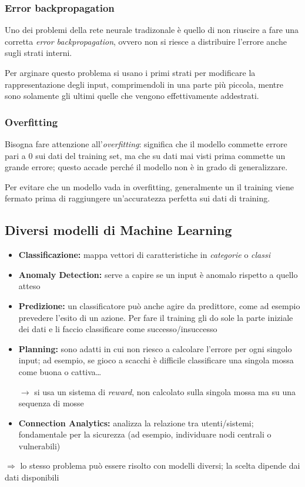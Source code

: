 \documentclass{report}
\begin{document}
\subsubsection{Error backpropagation}
Uno dei problemi della rete neurale tradizonale è quello di non riuscire a fare una corretta \textit{error backpropagation}, ovvero non 
si riesce a distribuire l'errore anche sugli strati interni.

\noindent Per arginare questo problema si usano i primi strati per modificare la rappresentazione degli input, comprimendoli 
in una parte più piccola, mentre sono solamente gli 
ultimi quelle che vengono effettivamente addestrati.

\subsubsection{Overfitting}
Bisogna fare attenzione all'\textit{overfitting}: significa che il modello commette errore pari a 0 sui dati del training set, ma che 
su dati mai visti prima commette un grande errore; questo accade perché il modello non è in grado di generalizzare.

\noindent Per evitare che un modello vada in overfitting, generalmente un il training viene fermato prima di raggiungere un'accuratezza perfetta 
sui dati di training.


\subsection{Diversi modelli di Machine Learning}
\begin{itemize}
    \item \textbf{Classificazione:} mappa vettori di caratteristiche in \textit{categorie} o \textit{classi}
    \item \textbf{Anomaly Detection:} serve a capire se un input è anomalo rispetto a quello atteso 
    \item \textbf{Predizione:} un classificatore può anche agire da predittore, come ad esempio prevedere l'esito di un azione. Per fare il training 
    gli do sole la parte iniziale dei dati e li faccio classificare come successo/insuccesso
    \item \textbf{Planning:} sono adatti in cui non riesco a calcolare l'errore per ogni singolo input; ad esempio, se gioco a scacchi è difficile 
    classificare una singola mossa come buona o cattiva\dots

    $\rightarrow$ si usa un sistema di \textit{reward}, non calcolato sulla singola mossa ma su una sequenza di mosse
    \item \textbf{Connection Analytics:} analizza la relazione tra utenti/sistemi; fondamentale per la sicurezza (ad esempio, individuare 
    nodi centrali o vulnerabili)
\end{itemize}

\noindent $\Rightarrow$ lo stesso problema può essere risolto con modelli diversi; la scelta dipende dai dati disponibili
\end{document}
